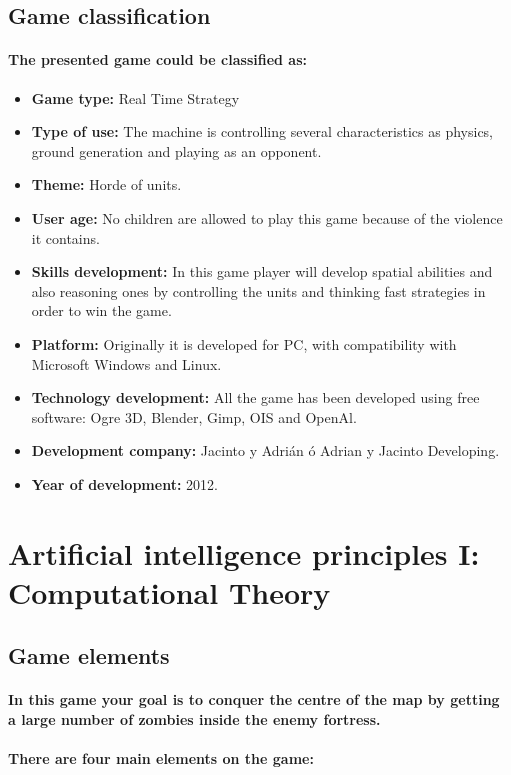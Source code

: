 \documentclass[a4paper,10pt]{article}
\newcommand{\p}[1]{\paragraph{\indent\textnormal{#1}}}
\begin{document}
  \subsection{Game classification}

    \p{The presented game could be classified as:}

    \begin{itemize}
     \item \textbf{Game type:} Real Time Strategy
     \item \textbf{Type of use:} The machine is controlling several characteristics as physics, ground generation and playing as an opponent.
     \item \textbf{Theme:} Horde of units.
     \item \textbf{User age:} No children are allowed to play this game because of the violence it contains.
     \item \textbf{Skills development:} In this game player will develop spatial abilities and also reasoning ones by controlling the units and thinking fast strategies in order to win the game.
     \item \textbf{Platform:} Originally it is developed for PC, with compatibility with Microsoft Windows and Linux.
     \item \textbf{Technology development:} All the game has been developed using free software: Ogre 3D, Blender, Gimp, OIS and OpenAl.
     \item \textbf{Development company:} Jacinto y Adrián ó Adrian y Jacinto Developing.
     \item \textbf{Year of development:} 2012.
    \end{itemize}

    

\newpage
\section{Artificial intelligence principles I: Computational Theory}

  \subsection{Game elements}

    \p{In this game your goal is to conquer the centre of the map by getting a large number of zombies inside the enemy fortress.}

    \p{There are four main elements on the game:}
\end{document}
